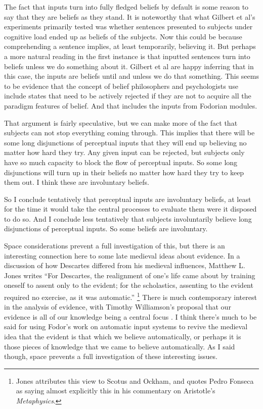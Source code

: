The fact that inputs turn into fully fledged beliefs by default is some reason to say that they are beliefs as they stand. It is noteworthy that what Gilbert et al's experiments primarily tested was whether sentences presented to subjects under cognitive load ended up as beliefs of the subjects. Now this could be because comprehending a sentence implies, at least temporarily, believing it. But perhaps a more natural reading in the first instance is that inputted sentences turn into beliefs unless we do something about it. Gilbert et al are happy inferring that in this case, the inputs are beliefs until and unless we do that something. This seems to be evidence that the concept of belief philosophers and psychologists use include states that need to be actively rejected if they are not to acquire all the paradigm features of belief. And that includes the inputs from Fodorian modules.

That argument is fairly speculative, but we can make more of the fact that subjects can not stop everything coming through. This implies that there will be some long disjunctions of perceptual inputs that they will end up believing no matter how hard they try. Any given input can be rejected, but subjects only have so much capacity to block the flow of perceptual inputs. So some long disjunctions will turn up in their beliefs no matter how hard they try to keep them out. I think these are involuntary beliefs.

So I conclude tentatively that perceptual inputs are involuntary beliefs, at least for the time it would take the central processes to evaluate them were it disposed to do so. And I conclude less tentatively that subjects involuntarily believe long disjunctions of perceptual inputs. So some beliefs are involuntary.

Space considerations prevent a full investigation of this, but there is an interesting connection here to some late medieval ideas about evidence. In a discussion of how Descartes differed from his medieval influences, Matthew L. Jones writes ``For Descartes, the realignment of one's life came about by training oneself to assent only to the evident; for the scholastics, assenting to the evident required no exercise, as it was automatic.'' \cite[84]{Jones2006}\footnote{Jones attributes this view to Scotus and Ockham, and quotes Pedro Fonseca as saying almost explicitly this in his commentary on Aristotle's \textit{Metaphysics}.} There is much contemporary interest in the analysis of evidence, with Timothy Williamson's proposal that our evidence is all of our knowledge being a central focus \cite[Ch. 9]{Williamson2000-WILKAI}. I think there's much to be said for using Fodor's work on automatic input systems to revive the medieval idea that the evident is that which we believe automatically, or perhaps it is those pieces of knowledge that we came to believe automatically. As I said though, space prevents a full investigation of these interesting issues.

